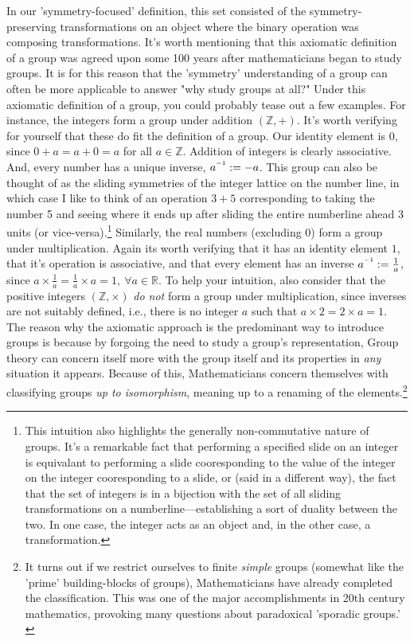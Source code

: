 \documentclass[11pt, a4paper]{report}
\newcommand{\inv}{^{\raisebox{.2em}{$\scriptscriptstyle-1$}}}
\newcommand{\reals}{\mathbb{R}}
\begin{document}
  In our 'symmetry-focused' definition, this set consisted of the symmetry-preserving transformations on an object where the binary operation was composing transformations. It's worth mentioning that this axiomatic definition of a group was agreed upon some 100 years after mathematicians began to study groups. It is for this reason that the 'symmetry' understanding of a group can often be more applicable to answer "why study groups at all?" Under this axiomatic definition of a group, you could probably tease out a few examples. For instance, the integers form a group under addition $(\mathbb{Z}, +)$. It's worth verifying for yourself that these do fit the definition of a group. Our identity element is 0, since $0 + a = a + 0 = a$ for all $a \in \mathbb{Z}$. Addition of integers is clearly associative. And, every number has a unique inverse, $a\inv := -a$. This group can also be thought of as the sliding symmetries of the integer lattice on the number line, in which case I like to think of an operation $3+5$ corresponding to taking the number 5 and seeing where it ends up after sliding the entire numberline ahead 3 units (or vice-versa).\footnote[0]{This intuition also highlights the generally non-commutative nature of groups. It's a remarkable fact that performing a specified slide on an integer is equivalant to performing a slide cooresponding to the value of the integer on the integer cooresponding to a slide, or (said in a different way), the fact that the set of integers is in a bijection with the set of all sliding transformations on a numberline—establishing a sort of duality between the two. In one case, the integer acts as an object and, in the other case, a transformation.} Similarly, the real numbers (excluding 0) form a group under multiplication. Again its worth verifying that it has an identity element $1$, that it's operation is associative, and that every element has an inverse $a\inv := \frac{1}{a}$, since $a\times \frac{1}{a} = \frac{1}{a} \times a = 1, \ \forall  a \in \reals$. To help your intuition, also consider that the positive integers $(\mathbb{Z},\times)$  \textit{do not} form a group under multiplication, since inverses are not suitably defined, i.e., there is no integer $a$ such that $a\times 2 = 2 \times a = 1$.
  The reason why the axiomatic approach is the predominant way to introduce groups is because by forgoing the need to study a group's representation, Group theory can concern itself more with the group itself and its properties in \textit{any} situation it appears. Because of this, Mathematicians concern themselves with classifying groups \textit{up to isomorphism}, meaning up to a renaming of the elements.\footnote[0]{It turns out if we restrict ourselves to finite \textit{simple} groups (somewhat like the 'prime' building-blocks of groups), Mathematicians have already completed the classification. This was one of the major accomplishments in 20th century mathematics, provoking many questions about paradoxical 'sporadic groups.'\\\autocite{aschbacher}}
\end{document}
